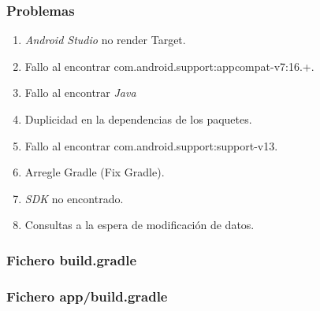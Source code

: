 \begin{frame}
	\frametitle{Problemas}
		\begin{enumerate}
			\item {\it Android Studio} no render Target.
			\item Fallo al encontrar {\ttfamily com.android.support:appcompat-v7:16.+}.
			\item Fallo al encontrar {\it Java}
			\item Duplicidad en la dependencias de los paquetes.
			\item Fallo al encontrar {\ttfamily com.android.support:support-v13}.
			\item Arregle {\ttfamily Gradle} (Fix {\ttfamily Gradle}).
			\item {\it SDK} no encontrado.
			\item Consultas a la espera de modificación de datos.
		\end{enumerate}
	\endblock{}
\end{frame}


\begin{frame}
	\frametitle{Fichero {\ttfamily build.gradle}}
	
\end{frame}


\begin{frame}
	\frametitle{Fichero {\ttfamily app/build.gradle}}
	
\end{frame}
